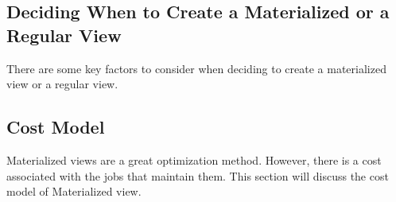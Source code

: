 \subsection{Deciding When to Create a Materialized or a Regular View}There are some key factors to consider when deciding to create a materialized view or a regular view.




 \subsection{Cost Model}
Materialized views are a great optimization method. However, there is a cost associated with the jobs that maintain them. This section will discuss the cost model of Materialized view.\vspace{.4cm}

